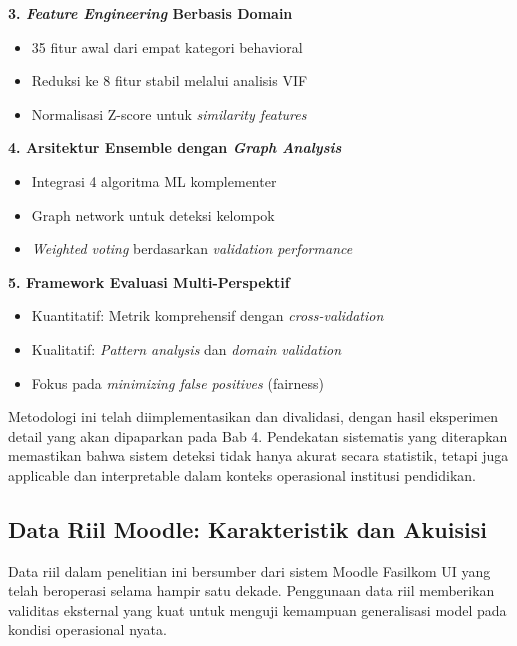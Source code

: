 \textbf{3. \textit{Feature Engineering} Berbasis Domain}
\begin{itemize}
    \item 35 fitur awal dari empat kategori behavioral
    \item Reduksi ke 8 fitur stabil melalui analisis VIF
    \item Normalisasi Z-score untuk \textit{similarity features}
\end{itemize}

\textbf{4. Arsitektur Ensemble dengan \textit{Graph Analysis}}
\begin{itemize}
    \item Integrasi 4 algoritma ML komplementer
    \item Graph network untuk deteksi kelompok
    \item \textit{Weighted voting} berdasarkan \textit{validation performance}
\end{itemize}

\textbf{5. Framework Evaluasi Multi-Perspektif}
\begin{itemize}
    \item Kuantitatif: Metrik komprehensif dengan \textit{cross-validation}
    \item Kualitatif: \textit{Pattern analysis} dan \textit{domain validation}
    \item Fokus pada \textit{minimizing false positives} (fairness)
\end{itemize}

Metodologi ini telah diimplementasikan dan divalidasi, dengan hasil eksperimen detail yang akan dipaparkan pada Bab 4. Pendekatan sistematis yang diterapkan memastikan bahwa sistem deteksi tidak hanya akurat secara statistik, tetapi juga applicable dan interpretable dalam konteks operasional institusi pendidikan.

\subsection{Data Riil Moodle: Karakteristik dan Akuisisi}
\label{sec:dataRiilMoodle}

Data riil dalam penelitian ini bersumber dari sistem Moodle Fasilkom UI yang telah beroperasi selama hampir satu dekade. Penggunaan data riil memberikan validitas eksternal yang kuat untuk menguji kemampuan generalisasi model pada kondisi operasional nyata.

